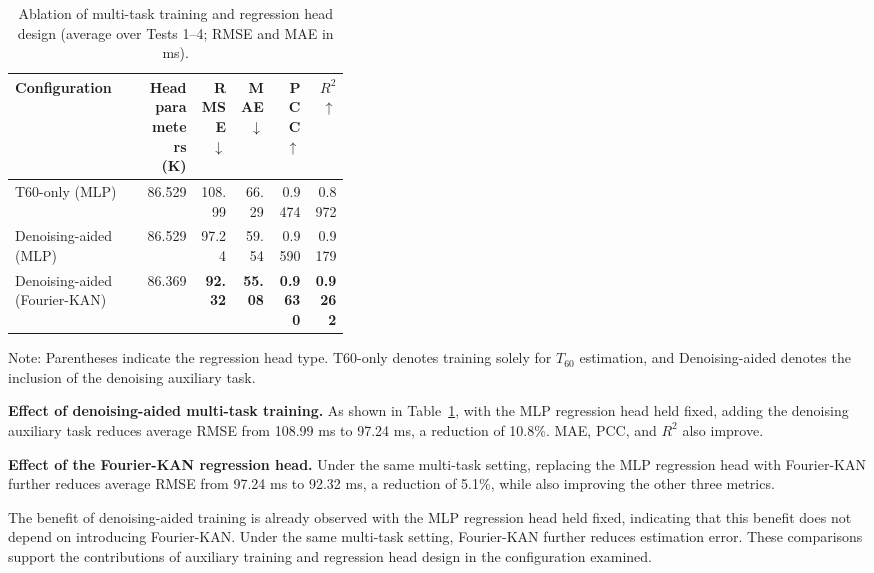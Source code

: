 \documentclass[a4paper,fleqn]{cas-sc}
\begin{document}


\begin{table}[pos=htbp]
  \centering
  \caption{Ablation of multi-task training and regression head design (average over Tests 1--4; RMSE and MAE in ms).}
  \label{tab:head}
  \small
  \begin{tabular}{p{0.39\linewidth}rrrrr}
    \toprule
    Configuration & Head parameters (K) & RMSE $\downarrow$ & MAE $\downarrow$ & PCC $\uparrow$ & $R^{2}$ $\uparrow$ \\
    \midrule
    T60-only (MLP) & 86.529 & 108.99 & 66.29 & 0.9474 & 0.8972 \\
    Denoising-aided (MLP) & 86.529 & 97.24 & 59.54 & 0.9590 & 0.9179 \\
    Denoising-aided (Fourier-KAN) & 86.369 & \textbf{92.32} & \textbf{55.08} & \textbf{0.9630} & \textbf{0.9262} \\
    \bottomrule
  \end{tabular}
  \par\smallskip
  \begin{minipage}{\linewidth}
    \footnotesize Note: Parentheses indicate the regression head type. T60-only denotes training solely for $T_{60}$ estimation, and Denoising-aided denotes the inclusion of the denoising auxiliary task.
  \end{minipage}
\end{table}



\textbf{Effect of denoising-aided multi-task training.} As shown in Table~\ref{tab:head}, with the MLP regression head held fixed, adding the denoising auxiliary task reduces average RMSE from 108.99 ms to 97.24 ms, a reduction of 10.8\%. MAE, PCC, and $R^{2}$ also improve.



\textbf{Effect of the Fourier-KAN regression head.} Under the same multi-task setting, replacing the MLP regression head with Fourier-KAN further reduces average RMSE from 97.24 ms to 92.32 ms, a reduction of 5.1\%, while also improving the other three metrics.

The benefit of denoising-aided training is already observed with the MLP regression head held fixed, indicating that this benefit does not depend on introducing Fourier-KAN. Under the same multi-task setting, Fourier-KAN further reduces estimation error. These comparisons support the contributions of auxiliary training and regression head design in the configuration examined.
\end{document}
